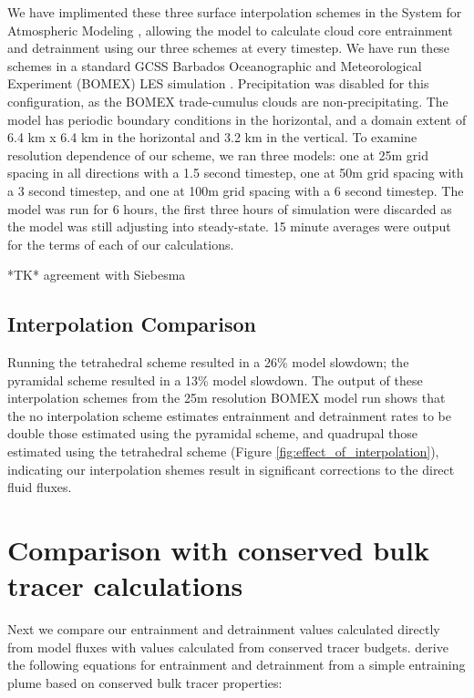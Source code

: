 \documentclass[12pt]{article}
\begin{document}
We have implimented these three surface interpolation schemes in the System for 
Atmospheric Modeling \citep[SAM;][]{Khairoutdinov2003}, allowing the model to 
calculate cloud core entrainment and detrainment using our three schemes at 
every timestep.  We have run these schemes in a standard GCSS Barbados 
Oceanographic and Meteorological Experiment (BOMEX) LES simulation 
\citep{Holland1973, Siebesma2003}.  Precipitation was disabled for this 
configuration, as the BOMEX trade-cumulus clouds are non-precipitating.  The 
model has periodic boundary conditions in the horizontal, and a domain extent 
of 6.4 km x 6.4 km in the horizontal and 3.2 km in the vertical.  To examine 
resolution dependence of our scheme, we ran three models: one at 25m grid 
spacing in all directions with a 1.5 second timestep, one at 50m grid spacing 
with a 3 second timestep, and one at 100m grid spacing with a 6 second 
timestep.  The model was run for 6 hours, the first three hours of simulation 
were discarded as the model was still adjusting into steady-state.  15 minute 
averages were output for the terms of each of our calculations.

*TK* agreement with Siebesma

\subsection{Interpolation Comparison}


Running the tetrahedral scheme resulted in a 26\% model slowdown; the 
pyramidal scheme resulted in a 13\% model slowdown.  The output of these 
interpolation schemes from the 25m resolution BOMEX model run shows that the 
no interpolation scheme estimates entrainment and detrainment rates to be 
double those estimated using the pyramidal scheme, and quadrupal those 
estimated using the tetrahedral scheme (Figure 
\ref{fig:effect_of_interpolation}), indicating our interpolation shemes result 
in significant corrections to the direct fluid fluxes.


\section{Comparison with conserved bulk tracer calculations}

Next we compare our entrainment and detrainment values calculated directly from 
model fluxes with values calculated from conserved tracer budgets.  
\cite{Siebesma1995} derive the following equations for entrainment and 
detrainment from a simple entraining plume based on conserved bulk tracer 
properties:
\end{document}
